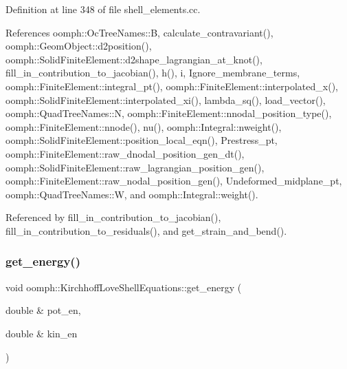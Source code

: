 Definition at line 348 of file shell\+\_\+elements.\+cc.



References oomph\+::\+Oc\+Tree\+Names\+::B, calculate\+\_\+contravariant(), oomph\+::\+Geom\+Object\+::d2position(), oomph\+::\+Solid\+Finite\+Element\+::d2shape\+\_\+lagrangian\+\_\+at\+\_\+knot(), fill\+\_\+in\+\_\+contribution\+\_\+to\+\_\+jacobian(), h(), i, Ignore\+\_\+membrane\+\_\+terms, oomph\+::\+Finite\+Element\+::integral\+\_\+pt(), oomph\+::\+Finite\+Element\+::interpolated\+\_\+x(), oomph\+::\+Solid\+Finite\+Element\+::interpolated\+\_\+xi(), lambda\+\_\+sq(), load\+\_\+vector(), oomph\+::\+Quad\+Tree\+Names\+::N, oomph\+::\+Finite\+Element\+::nnodal\+\_\+position\+\_\+type(), oomph\+::\+Finite\+Element\+::nnode(), nu(), oomph\+::\+Integral\+::nweight(), oomph\+::\+Solid\+Finite\+Element\+::position\+\_\+local\+\_\+eqn(), Prestress\+\_\+pt, oomph\+::\+Finite\+Element\+::raw\+\_\+dnodal\+\_\+position\+\_\+gen\+\_\+dt(), oomph\+::\+Solid\+Finite\+Element\+::raw\+\_\+lagrangian\+\_\+position\+\_\+gen(), oomph\+::\+Finite\+Element\+::raw\+\_\+nodal\+\_\+position\+\_\+gen(), Undeformed\+\_\+midplane\+\_\+pt, oomph\+::\+Quad\+Tree\+Names\+::W, and oomph\+::\+Integral\+::weight().



Referenced by fill\+\_\+in\+\_\+contribution\+\_\+to\+\_\+jacobian(), fill\+\_\+in\+\_\+contribution\+\_\+to\+\_\+residuals(), and get\+\_\+strain\+\_\+and\+\_\+bend().

\mbox{\label{classoomph_1_1KirchhoffLoveShellEquations_a766bde0ab2904a6d73e2fa116dfa8738}} 
\subsubsection{\texorpdfstring{get\+\_\+energy()}{get\_energy()}}
{\footnotesize\ttfamily void oomph\+::\+Kirchhoff\+Love\+Shell\+Equations\+::get\+\_\+energy (\begin{DoxyParamCaption}\item[{double \&}]{pot\+\_\+en,  }\item[{double \&}]{kin\+\_\+en }\end{DoxyParamCaption})}



